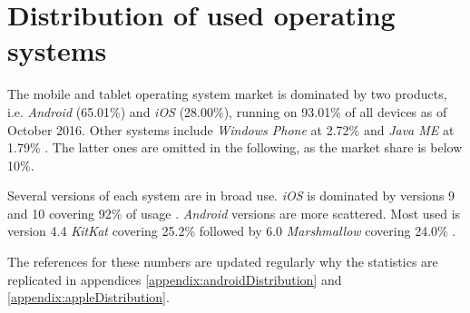\section{Distribution of used operating systems}\label{preStudy:devices}

The mobile and tablet operating system market is dominated by two products, i.e. \textit{Android} (65.01\%) and \textit{iOS} (28.00\%), running on 93.01\% of all devices as of October 2016.
Other systems include \textit{Windows Phone} at 2.72\% and \textit{Java ME} at 1.79\% \citep{preStudy:devices:companies}.
The latter ones are omitted in the following, as the market share is below 10\%.

Several versions of each system are in broad use.
\textit{iOS} is dominated by versions 9 and 10 covering 92\% of usage \citep{preStudy:devices:apple}.
\textit{Android} versions are more scattered. 
Most used is version 4.4 \textit{KitKat} covering 25.2\% followed by 6.0 \textit{Marshmallow} covering 24.0\% \citep{preStudy:devices:android}.

The references for these numbers are updated regularly why the statistics are replicated in appendices \ref{appendix:androidDistribution} and \ref{appendix:appleDistribution}.

